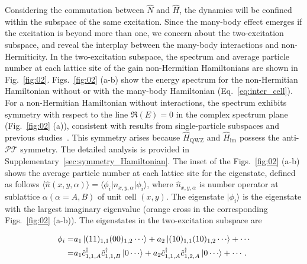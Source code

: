 \documentclass[longbibliography, aps, prx, amsmath, amssymb, amsfonts, twocolumn,superscriptaddress, footinbib]{revtex4-1}
\begin{document}
	Considering the commutation between $\hat{N}$ and $\hat{H}$, the dynamics will be confined within the subspace of the same excitation. Since the many-body effect emerges if the excitation is beyond more than one, we concern about the two-excitation subspace, and reveal the interplay between the many-body interactions and non-Hermiticity. 
	In the two-excitation subspace, the spectrum and average particle number at each lattice site of the gain non-Hermitian Hamiltonians 
	are shown in Fig.~\ref{fig:02}.
	Figs.~\ref{fig:02} (a-b) show the energy spectrum
	for the non-Hermitian Hamiltonian without or with the many-body Hamiltonian (Eq.~\ref{eq:inter_cell}). 
    For a non-Hermitian Hamiltonian without interactions, the spectrum exhibits symmetry with respect to the line $\Re(E)=0$ in the complex spectrum plane (Fig.~\ref{fig:02} (a)), consistent with results from single-particle subspaces and previous studies~\cite{nakamura2023universal, ma2024non,schindler2023hermitian}. This symmetry arises because $\hat{H}_{\text{QWZ}}$ and $\hat{H}_{\text{im}}$ possess the anti-$\mathcal{PT}$ symmetry.
	The detailed analysis is provided in Supplementary~\ref{sec:symmetry_Hamiltonian}.
	The inset of the Figs.~\ref{fig:02} (a-b) shows the average particle number at each lattice site for the eigenstate, defined as follows $\langle \hat{n}(x,y,\alpha) \rangle = \langle \phi_i \vert \hat{n}_{x,y,\alpha} \vert \phi_i \rangle$,
	where 
	$\hat{n}_{x,y,\alpha}$ is number operator at sublattice $\alpha (\alpha=A,B)$ of unit cell $(x,y)$.
	The eigenstate $\vert \phi_i \rangle$ is the eigenstate with the largest imaginary eigenvalue (orange cross in the corresponding Figs.~\ref{fig:02} (a-b)). The eigenstates in the two-excitation subspace are
    \begin{small}
    \begin{equation}
		\begin{split}
			\phi_i =& a_1 \ket{(11)_{1,1}(00)_{1,2}\cdots} + a_2 \ket{(10)_{1,1}(10)_{1,2}\cdots} + \cdots\\
			=& a_1 \hat{c}_{1,1,A}^{\dagger}\hat{c}_{1,1,B}^{\dagger} \ket{0\cdots} + a_2 \hat{c}_{1,1,A}^{\dagger}\hat{c}_{1,2,A}^{\dagger} \ket{0\cdots} + \cdots.
		\end{split}\label{eq2}
	\end{equation}
    \end{small}
\end{document}
